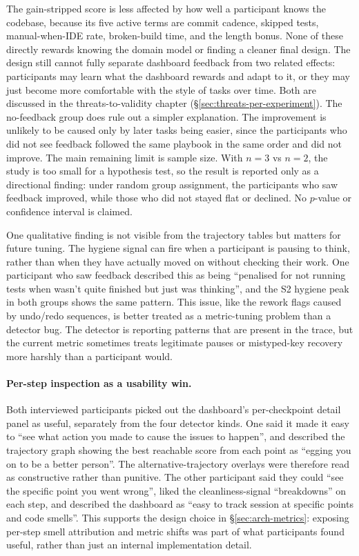 The gain-stripped score is less affected by how well a participant knows the codebase, because its five active terms are commit cadence, skipped tests, manual-when-IDE rate, broken-build time, and the length bonus. None of these directly rewards knowing the domain model or finding a cleaner final design. The design still cannot fully separate dashboard feedback from two related effects: participants may learn what the dashboard rewards and adapt to it, or they may just become more comfortable with the style of tasks over time. Both are discussed in the threats-to-validity chapter (\S\ref{sec:threats-per-experiment}). The no-feedback group does rule out a simpler explanation. The improvement is unlikely to be caused only by later tasks being easier, since the participants who did not see feedback followed the same playbook in the same order and did not improve. The main remaining limit is sample size. With $n = 3$ vs $n = 2$, the study is too small for a hypothesis test, so the result is reported only as a directional finding: under random group assignment, the participants who saw feedback improved, while those who did not stayed flat or declined. No $p$-value or confidence interval is claimed.

One qualitative finding is not visible from the trajectory tables but matters for future tuning. The hygiene signal can fire when a participant is pausing to think, rather than when they have actually moved on without checking their work. One participant who saw feedback described this as being ``penalised for not running tests when wasn't quite finished but just was thinking'', and the S2 hygiene peak in both groups shows the same pattern. This issue, like the rework flags caused by undo/redo sequences, is better treated as a metric-tuning problem than a detector bug. The detector is reporting patterns that are present in the trace, but the current metric sometimes treats legitimate pauses or mistyped-key recovery more harshly than a participant would.

\paragraph{Per-step inspection as a usability win.}
\label{sec:results-userstudy-stepui}
Both interviewed participants picked out the dashboard's per-checkpoint detail panel as useful, separately from the four detector kinds. One said it made it easy to ``see what action you made to cause the issues to happen'', and described the trajectory graph showing the best reachable score from each point as ``egging you on to be a better person''. The alternative-trajectory overlays were therefore read as constructive rather than punitive. The other participant said they could ``see the specific point you went wrong'', liked the cleanliness-signal ``breakdowns'' on each step, and described the dashboard as ``easy to track session at specific points and code smells''. This supports the design choice in \S\ref{sec:arch-metrics}: exposing per-step smell attribution and metric shifts was part of what participants found useful, rather than just an internal implementation detail.


